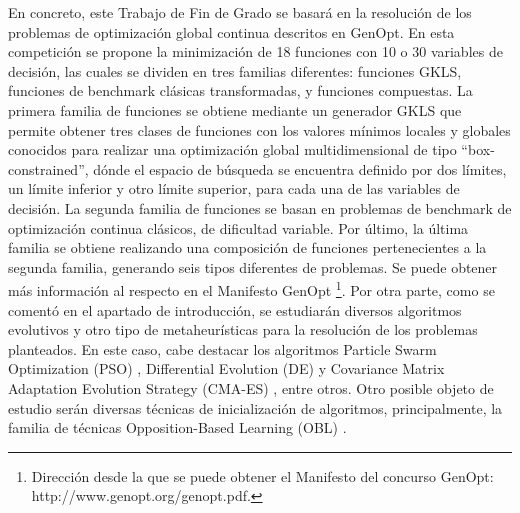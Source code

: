 En concreto, este Trabajo de Fin de Grado se basará en la resolución de los problemas de optimización global continua descritos en GenOpt. En esta competición se propone la minimización de 18 funciones con 10 o 30 variables de decisión, las cuales se dividen en tres familias diferentes: funciones GKLS, funciones de benchmark clásicas transformadas, y funciones compuestas.
La primera familia de funciones se obtiene mediante un generador GKLS \cite{GKLS} que permite obtener tres clases de funciones con los valores mínimos locales y globales conocidos para realizar una optimización global multidimensional de tipo “box-constrained”, dónde el espacio de búsqueda se encuentra definido por dos límites, un límite inferior y otro límite superior, para cada una de las variables de decisión.
La segunda familia de funciones se basan en problemas de benchmark de optimización continua clásicos, de dificultad variable.
\newline
Por último, la última familia se obtiene realizando una composición de funciones pertenecientes a la segunda familia, generando seis tipos diferentes de problemas.	
Se puede obtener más información al respecto en el Manifesto GenOpt \footnote{Dirección desde la que se puede obtener el Manifesto del concurso GenOpt: http://www.genopt.org/genopt.pdf.}.
Por otra parte, como se comentó en el apartado de introducción, se estudiarán diversos algoritmos evolutivos y otro tipo de metaheurísticas para la resolución de los problemas planteados. En este caso, cabe destacar los algoritmos Particle Swarm Optimization (PSO) \cite{GPSO}, Differential Evolution (DE) \cite{metabook} y Covariance Matrix Adaptation Evolution Strategy (CMA-ES) \cite{CMA}, entre otros. Otro posible objeto de estudio serán diversas técnicas de inicialización de algoritmos, principalmente, la familia de técnicas Opposition-Based Learning (OBL) \cite{obl2}.


